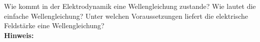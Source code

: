 \begin{question}[section=5,subsection=51,name={Wellengleichung},difficulty=8,type=mdl,mode=exm,tags={}]
	Wie kommt in der Elektrodynamik eine Wellengleichung zustande? Wie lautet die einfache Wellengleichung? Unter welchen Voraussetzungen liefert die elektrische Feldstärke eine Wellengleichung?
	\\ \textbf{Hinweis:}\\
	
\end{question}
\begin{solution}
	
\end{solution}